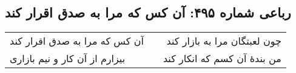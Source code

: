 \begin{center}
\section*{رباعی شماره ۴۹۵: آن کس که مرا به صدق اقرار کند}
\label{sec:0495}
\begin{longtable}{l p{0.5cm} r}
آن کس که مرا به صدق اقرار کند
&&
چون لعبتگان مرا به بازار کند
\\
بیزارم از آن کار و نیم بازاری
&&
من بندهٔ آن کسم که انکار کند
\\
\end{longtable}
\end{center}
